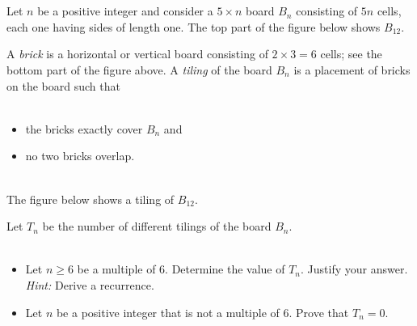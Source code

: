 \documentclass[12pt]{article}
\begin{document}
\begin{question} \\ \\
Let $n$ be a positive integer and consider a $5 \times n$ board $B_n$
consisting of $5n$ cells, each one having sides of length one. The top
part of the figure below shows $B_{12}$.


A \emph{brick} is a horizontal or vertical board consisting of 
$2 \times 3 = 6$ cells; see the bottom part of the figure above.
A \emph{tiling} of the board $B_n$ is a placement of bricks on the
board such that \\ \\
\parbox{\linewidth}{
\begin{itemize}
\item the bricks exactly cover $B_n$ and
\item no two bricks overlap.
\end{itemize}}
\\
The figure below shows a tiling of $B_{12}$.

Let $T_n$ be the number of different tilings of the board $B_n$. \\  \\
\parbox{\linewidth}{
\begin{itemize} 
\item Let $n \geq 6$ be a multiple of $6$. Determine the value of $T_n$.
      Justify your answer. \emph{Hint:} Derive a recurrence.  
\item Let $n$ be a positive integer that is not a multiple of $6$. 
      Prove that $T_n = 0$. 
\end{itemize}
}
\end{question} 
\end{document}
